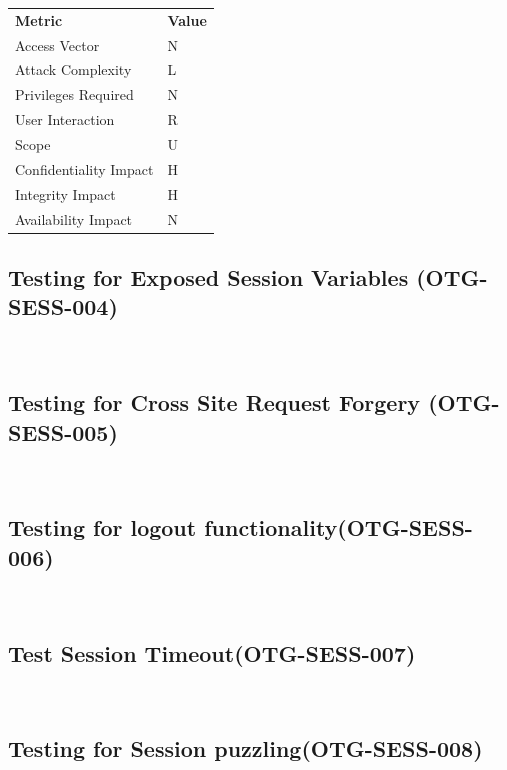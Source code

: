 \documentclass[headsepline,footsepline,footinclude=false,oneside,fontsize=11pt,paper=a4,listof=totoc,bibliography=totoc]{scrbook} %
\begin{document}
\begin{center}
	\begin{tabular}{ll}
		\rowcolor[HTML]{34CDF9}
		{\color[HTML]{ECF4FF} \textbf{Metric}}        & {\color[HTML]{ECF4FF} \textbf{Value}} \\
		\rowcolor[HTML]{BBDAFF}
		{\color[HTML]{333333} Access Vector}          & {\color[HTML]{333333} } N             \\
		\rowcolor[HTML]{ECF4FF}
		{\color[HTML]{333333} Attack Complexity}      & {\color[HTML]{333333} } L              \\
		\rowcolor[HTML]{BBDAFF}
		{\color[HTML]{333333} Privileges Required}    & {\color[HTML]{333333} } N              \\
		\rowcolor[HTML]{ECF4FF}
		{\color[HTML]{333333} User Interaction}       & {\color[HTML]{333333} } R              \\
		\rowcolor[HTML]{BBDAFF}
		{\color[HTML]{333333} Scope}                  & {\color[HTML]{333333} } U              \\
		\rowcolor[HTML]{ECF4FF}
		{\color[HTML]{333333} Confidentiality Impact} & {\color[HTML]{333333} } H              \\
		\rowcolor[HTML]{BBDAFF}
		{\color[HTML]{333333} Integrity Impact}       & {\color[HTML]{333333} } H              \\
		\rowcolor[HTML]{ECF4FF}
		{\color[HTML]{333333} Availability Impact}    & {\color[HTML]{333333} } N
	\end{tabular}
\end{center}
\pagebreak
\subsection{Testing for Exposed Session Variables (OTG-SESS-004)}\
\pagebreak
\subsection{Testing for Cross Site Request Forgery (OTG-SESS-005)}\
\pagebreak
\subsection{Testing for logout functionality(OTG-SESS-006)}\
\pagebreak
\subsection{Test Session Timeout(OTG-SESS-007)}\
\pagebreak
\subsection{Testing for Session puzzling(OTG-SESS-008)}\
\end{document}
